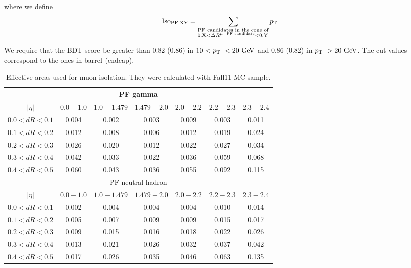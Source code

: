 where we define 
\begin{eqnarray} 
\textrm{Iso}_\textrm{PF,XY} 
= 
\sum_{
\begin{subarray}{l}
\textrm{PF candidates in the cone of} \\
\textrm{0.X}   < \Delta R^{\mu-\textrm{PF candidate}} < \textrm{0.Y} 
    \end{subarray} }
p_\mathrm{T}
\end{eqnarray} 

We require that the BDT score be greater than 0.82 (0.86) in $10<p_\mathrm{T}~<20~\mathrm{Ge\kern -0.1em V}$ 
and 0.86 (0.82) in $p_\mathrm{T}~>20~\mathrm{Ge\kern -0.1em V}$. The cut values correspond to the ones in barrel (endcap).

\begin{table}[htp]
	\centering
    \footnotesize
    \vspace{0.5cm} 
    \caption{ Effective areas used for muon isolation. They were calculated with Fall11 MC sample.}
    \vspace{0.5cm} 
		\begin{tabular}{c|c|c|c|c|c|c}
			\hline 
				\multicolumn{7}{c}{PF gamma} \\
	  	    \hline
			 	$|\eta|$     & $0.0 - 1.0$ & $1.0 - 1.479$ & $1.479 - 2.0$ & $2.0 - 2.2$ & $2.2 - 2.3$ & $2.3-2.4$ \\       		
	  	    \hline \hline
				$0.0<dR<0.1$ & 0.004& 0.002& 0.003& 0.009& 0.003& 0.011 \\
				$0.1<dR<0.2$ & 0.012& 0.008& 0.006& 0.012& 0.019& 0.024 \\
				$0.2<dR<0.3$ & 0.026& 0.020& 0.012& 0.022& 0.027& 0.034 \\
				$0.3<dR<0.4$ & 0.042& 0.033& 0.022& 0.036& 0.059& 0.068 \\
				$0.4<dR<0.5$ & 0.060& 0.043& 0.036& 0.055& 0.092& 0.115 \\
	  	    \hline \hline 
				\multicolumn{7}{c}{PF neutral hadron} \\
	  	    \hline 
			 	$|\eta|$     & $0.0 - 1.0$ & $1.0 - 1.479$ & $1.479 - 2.0$ & $2.0 - 2.2$ & $2.2 - 2.3$ & $2.3-2.4$ \\       		
	  	    \hline \hline
				$0.0<dR<0.1$ & 0.002& 0.004& 0.004& 0.004& 0.010& 0.014 \\
			    $0.1<dR<0.2$ & 0.005& 0.007& 0.009& 0.009& 0.015& 0.017 \\
			    $0.2<dR<0.3$ & 0.009& 0.015& 0.016& 0.018& 0.022& 0.026 \\ 
				$0.3<dR<0.4$ & 0.013& 0.021& 0.026& 0.032& 0.037& 0.042 \\ 
				$0.4<dR<0.5$ & 0.017& 0.026& 0.035& 0.046& 0.063& 0.135 \\ 
			\hline
		\end{tabular}
	\label{tab:muAeff} 
\end{table}

